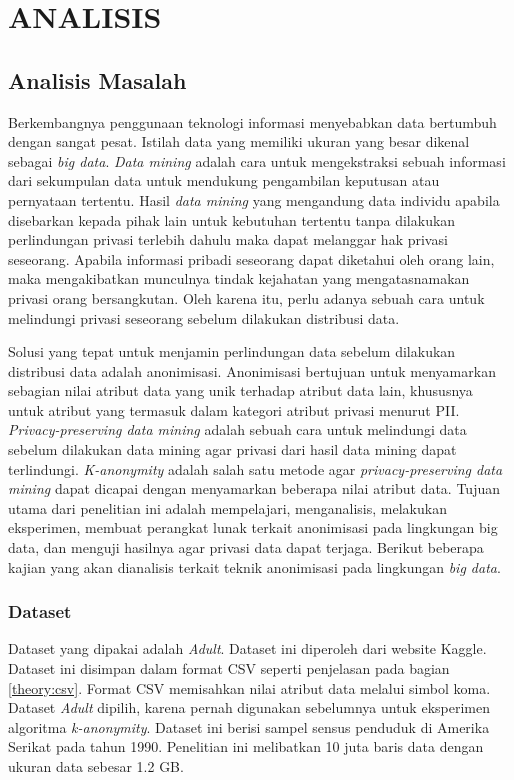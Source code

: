 \chapter{ANALISIS}
\section{Analisis Masalah}
Berkembangnya penggunaan teknologi informasi menyebabkan data bertumbuh dengan sangat pesat. Istilah data yang memiliki ukuran yang besar dikenal sebagai \textit{big data}. \textit{Data mining} adalah cara untuk mengekstraksi sebuah informasi dari sekumpulan data untuk mendukung pengambilan keputusan atau pernyataan tertentu. Hasil \textit{data mining} yang mengandung data individu apabila disebarkan kepada pihak lain untuk kebutuhan tertentu tanpa dilakukan perlindungan privasi terlebih dahulu maka dapat melanggar hak privasi seseorang. Apabila informasi pribadi seseorang dapat diketahui oleh orang lain, maka mengakibatkan munculnya tindak kejahatan yang mengatasnamakan privasi orang bersangkutan. Oleh karena itu, perlu adanya sebuah cara untuk melindungi privasi seseorang sebelum dilakukan distribusi data.

\par Solusi yang tepat untuk menjamin perlindungan data sebelum dilakukan distribusi data adalah anonimisasi. Anonimisasi bertujuan untuk menyamarkan sebagian nilai atribut data yang unik terhadap atribut data lain, khususnya untuk atribut yang termasuk dalam kategori atribut privasi menurut PII. \textit{Privacy-preserving data mining} adalah sebuah cara untuk melindungi data sebelum dilakukan data mining agar privasi dari hasil data mining dapat terlindungi. \textit{K-anonymity} adalah salah satu metode agar \textit{privacy-preserving data mining} dapat dicapai dengan menyamarkan beberapa nilai atribut data. Tujuan utama dari penelitian ini adalah mempelajari, menganalisis, melakukan eksperimen, membuat perangkat lunak terkait anonimisasi pada lingkungan big data, dan menguji hasilnya agar privasi data dapat terjaga. Berikut beberapa kajian yang akan dianalisis terkait teknik anonimisasi pada lingkungan \textit{big data}.

\subsection{Dataset}
Dataset yang dipakai adalah \textit{Adult}. Dataset ini diperoleh dari website Kaggle. Dataset ini disimpan dalam format CSV seperti penjelasan pada bagian \ref{theory:csv}. Format CSV memisahkan nilai atribut data melalui simbol koma. Dataset \textit{Adult} dipilih, karena pernah digunakan sebelumnya untuk eksperimen algoritma \textit{k-anonymity}. Dataset ini berisi sampel sensus penduduk di Amerika Serikat pada tahun 1990. Penelitian ini melibatkan 10 juta baris data dengan ukuran data sebesar 1.2 GB. 

